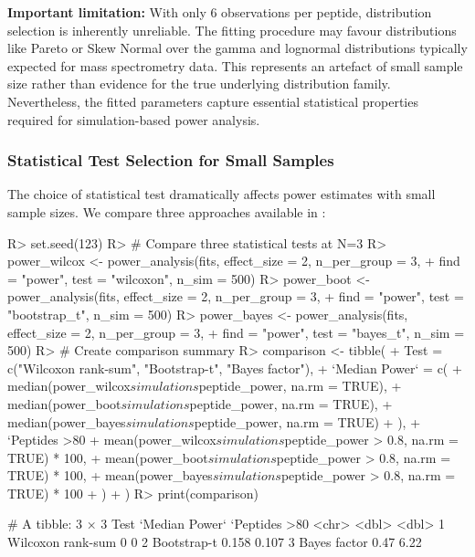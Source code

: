 \documentclass[article]{jss}
\begin{document}
\textbf{Important limitation:} With only 6 observations per peptide, distribution selection is inherently unreliable. The fitting procedure may favour distributions like Pareto or Skew Normal over the gamma and lognormal distributions typically expected for mass spectrometry data. This represents an artefact of small sample size rather than evidence for the true underlying distribution family. Nevertheless, the fitted parameters capture essential statistical properties required for simulation-based power analysis.

\subsubsection{Statistical Test Selection for Small Samples}

The choice of statistical test dramatically affects power estimates with small sample sizes. We compare three approaches available in :

\begin{Schunk}
\begin{Sinput}
R> set.seed(123)
R> # Compare three statistical tests at N=3
R> power_wilcox <- power_analysis(fits, effect_size = 2, n_per_group = 3,
+                                 find = "power", test = "wilcoxon", n_sim = 500)
R> power_boot <- power_analysis(fits, effect_size = 2, n_per_group = 3,
+                               find = "power", test = "bootstrap_t", n_sim = 500)
R> power_bayes <- power_analysis(fits, effect_size = 2, n_per_group = 3,
+                                find = "power", test = "bayes_t", n_sim = 500)
R> # Create comparison summary
R> comparison <- tibble(
+    Test = c("Wilcoxon rank-sum", "Bootstrap-t", "Bayes factor"),
+    `Median Power` = c(
+      median(power_wilcox$simulations$peptide_power, na.rm = TRUE),
+      median(power_boot$simulations$peptide_power, na.rm = TRUE),
+      median(power_bayes$simulations$peptide_power, na.rm = TRUE)
+    ),
+    `Peptides >80%
+      mean(power_wilcox$simulations$peptide_power > 0.8, na.rm = TRUE) * 100,
+      mean(power_boot$simulations$peptide_power > 0.8, na.rm = TRUE) * 100,
+      mean(power_bayes$simulations$peptide_power > 0.8, na.rm = TRUE) * 100
+    )
+  )
R> print(comparison)
\end{Sinput}
\begin{Soutput}
# A tibble: 3 × 3
  Test              `Median Power` `Peptides >80%
  <chr>                      <dbl>                 <dbl>
1 Wilcoxon rank-sum          0                     0    
2 Bootstrap-t                0.158                 0.107
3 Bayes factor               0.47                  6.22 
\end{Soutput}
\end{Schunk}
\end{document}

